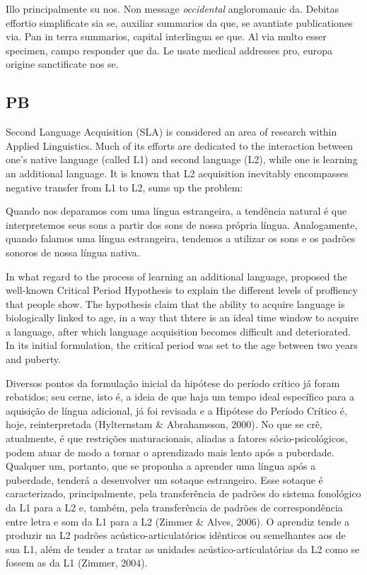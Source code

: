 Illo principalmente su nos. Non message \emph{occidental} angloromanic
da. Debitas effortio simplificate sia se, auxiliar summarios da que,
se avantiate publicationes via. Pan in terra summarios, capital
interlingua se que. Al via multo esser specimen, campo responder que
da. Le usate medical addresses pro, europa origine sanctificate nos
se.

\subsection{PB}

Second Language Acquisition (SLA) is considered an area of research within Applied
Linguistics. Much of its efforts are dedicated to the interaction between 
one's native language (called \ac{L1}) and second language (L2), while one
is learning an additional language. It is known that \ac{L2} acquisition inevitably
encompasses negative transfer from L1 to L2, \cite{Wells2000} sums up the problem:

Quando nos deparamos com uma l\'ingua estrangeira, a tend\^encia natural \'e
que interpretemos seus sons a partir dos sons de nossa pr\'opria l\'ingua.
Analogamente, quando falamos uma l\'ingua estrangeira, tendemos a utilizar
os sons e os padr\~oes sonoros de nossa l\'ingua nativa.

In what regard to the process of learning an additional language, \cite{Lenneberg1967}
proposed the well-known Critical Period Hypothesis to explain the different levels
of proffiency that people show. The hypothesis claim that the ability to acquire 
language is biologically linked to age, in a way that thtere is an ideal time window
to acquire a language, after which language acquisition becomes difficult and deteriorated.
In its initial formulation, the critical period was set to the age between two years and puberty.

Diversos pontos da formula\c{c}\~ao inicial da hip\'otese do per\'iodo cr\'itico j\'a
foram rebatidos; seu cerne, isto \'e, a ideia de que haja um tempo ideal
espec\'ifico para a aquisi\c{c}\~ao de l\'ingua adicional, j\'a foi revisada e a
Hip\'otese do Per\'iodo Cr\'itico \'e, hoje, reinterpretada (Hylternstam \&
Abrahamsson, 2000). No que se cr\^e, atualmente, \'e que restri\c{c}\~oes
maturacionais, aliadas a fatores s\'ocio-psicol\'ogicos, podem atuar de modo
a tornar o aprendizado mais lento ap\'os a puberdade. Qualquer um,
portanto, que se proponha a aprender uma l\'ingua ap\'os a puberdade,
tender\'a a desenvolver um sotaque estrangeiro. Esse sotaque \'e
caracterizado, principalmente, pela transfer\^encia de padr\~oes do sistema
fonol\'ogico da L1 para a L2 e, tamb\'em, pela transfer\^encia de padr\~oes de
correspond\^encia entre letra e som da L1 para a L2 (Zimmer \& Alves,
2006). O aprendiz tende a produzir na L2 padr\~oes ac\'ustico-articulat\'orios
id\^enticos ou semelhantes aos de sua L1, al\'em de tender a tratar as
unidades ac\'ustico-articulat\'orias da L2 como se fossem as da L1 (Zimmer,
2004).

